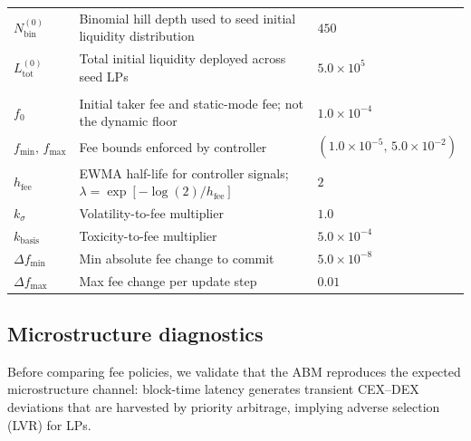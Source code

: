 \documentclass[11pt]{article}
\begin{document}
\begin{longtable}{|p{}|p{}|p{}|}
\rowcolor{groupgray}\multicolumn{3}{|l|}{\textbf{Initialization}}\\
\hline
\(N^{(0)}_{\text{bin}}\) & Binomial hill depth used to seed initial liquidity distribution & \(450\) \\
\hline
\(L^{(0)}_{\text{tot}}\) & Total initial liquidity deployed across seed LPs & \(5.0\times10^{5}\) \\
\hline\hline

\rowcolor{groupgray}\multicolumn{3}{|l|}{\textbf{Fee controller}}\\
\hline
\(f_0\) & Initial taker fee and static-mode fee; not the dynamic floor & \(1.0\times10^{-4}\) \\
\hline
\(f_{\min},\,f_{\max}\) & Fee bounds enforced by controller & \((1.0\times10^{-5},\,5.0\times10^{-2})\) \\
\hline
\(h_{\text{fee}}\) & EWMA half-life for controller signals; \(\lambda=\exp[-\log(2)/h_{\text{fee}}]\) & \(2\) \\
\hline
\(k_{\sigma}\) & Volatility-to-fee multiplier & \(1.0\) \\
\hline
\(k_{\text{basis}}\) & Toxicity-to-fee multiplier & \(5.0\times10^{-4}\) \\
\hline
\(\Delta f_{\min}\) & Min absolute fee change to commit & \(5.0\times10^{-8}\) \\
\hline
\(\Delta f_{\max}\) & Max fee change per update step & \(0.01\) \\
\hline
\end{longtable}
\endgroup

\FloatBarrier
\subsection{Microstructure diagnostics}
\label{sec:stylized}
Before comparing fee policies, we validate that the ABM reproduces the expected microstructure channel: block-time 
latency generates transient CEX--DEX deviations that are harvested by priority arbitrage, implying adverse selection (LVR) for LPs.
\end{document}
